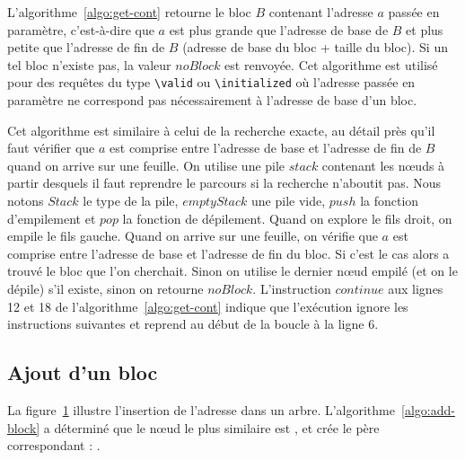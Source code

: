 L'algorithme~\ref{algo:get-cont} retourne le bloc $B$ contenant
l'adresse $a$ passée en paramètre, c'est-à-dire que $a$ est plus grande que
l'adresse de base de $B$ et plus petite que l'adresse de fin de $B$ (adresse
de base du bloc + taille du bloc).
Si un tel bloc n'existe pas, la valeur $noBlock$ est renvoyée.
Cet algorithme est utilisé pour des requêtes du type \lstinline{\valid} ou
\lstinline{\initialized} où l'adresse passée en paramètre ne correspond pas
nécessairement à l'adresse de base d'un bloc.

Cet algorithme est similaire à celui de la recherche exacte, au détail près
qu'il faut vérifier que $a$ est comprise entre l'adresse de base et l'adresse
de fin de $B$ quand on arrive sur une feuille.
On utilise une pile $stack$ contenant les n\oe{}uds à partir desquels il faut
reprendre le parcours si la recherche n'aboutit pas.
Nous notons $Stack$ le type de la pile, $emptyStack$ une pile vide, $push$ la
fonction d'empilement et $pop$ la fonction de dépilement.
Quand on explore le fils droit, on empile le fils gauche.
Quand on arrive sur une feuille, on vérifie que $a$ est comprise entre l'adresse
de base et l'adresse de fin du bloc.
Si c'est le cas alors a trouvé le bloc que l'on cherchait.
Sinon on utilise le dernier n\oe{}ud empilé (et on le dépile) s'il existe,
sinon on retourne $noBlock$.
L'instruction $continue$ aux lignes 12 et 18 de l'algorithme~\ref{algo:get-cont}
indique que l'exécution ignore les instructions suivantes et reprend au début de
la boucle à la ligne 6.


\subsection{Ajout d'un bloc}


La figure~\ref{fig:insertion-Patricia-trie} illustre l'insertion de l'adresse
 dans un arbre.
L'algorithme~\ref{algo:add-block} a déterminé que le n\oe{}ud le plus similaire
est , et crée le père correspondant :
.

\begin{figure}[h]
  
  \label{fig:insertion-Patricia-trie}
\end{figure}

